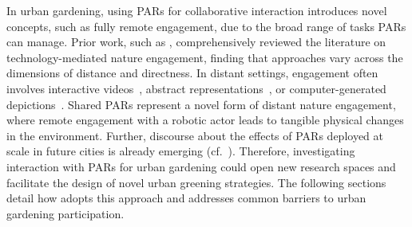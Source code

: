 In urban gardening, using PARs for collaborative interaction introduces novel concepts, such as fully remote engagement, due to the broad range of tasks PARs can manage. Prior work, such as \citet{Webber2023CHI}, comprehensively reviewed the literature on technology-mediated nature engagement, finding that approaches vary across the dimensions of distance and directness. In distant settings, engagement often involves interactive videos~\cite{mediatedNature}, abstract representations~\cite{abstractNature}, or computer-generated depictions~\cite{generatedNature}. Shared PARs represent a novel form of distant nature engagement, where remote engagement with a robotic actor leads to tangible physical changes in the environment. Further, discourse about the effects of PARs deployed at scale in future cities is already emerging (cf.~\cite{goddard2021}). Therefore, investigating interaction with PARs for urban gardening could open new research spaces and facilitate the design of novel urban greening strategies. The following sections detail how \system adopts this approach and addresses common barriers to urban gardening participation.